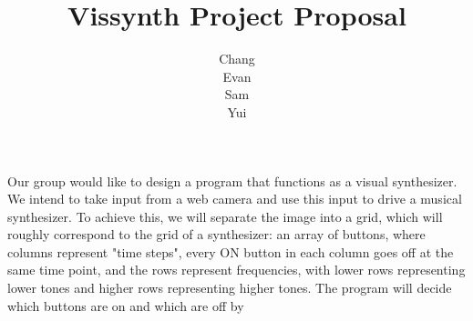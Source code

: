 \documentclass{article}
\title{Vissynth Project Proposal}
\author{Chang \\ Evan \\ Sam \\ Yui}
\begin{document}
\maketitle

Our group would like to design a program that functions as a visual synthesizer. We
intend to take input from a web camera and use this input to drive a musical
synthesizer. To achieve this, we will separate the image into a grid, which will
roughly correspond to the grid of a synthesizer: an array of buttons, where columns
represent "time steps", every ON button in each column goes off at the same time
point, and the rows represent frequencies, with lower rows representing lower tones
and higher rows representing higher tones. The program will decide which buttons are
on and which are off by 
\end{document}
